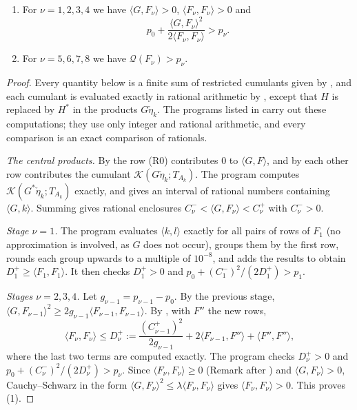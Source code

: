 \documentclass[11pt,colorlinks]{charlie}
\newcommand{\Ka}{\mathcal{K}}
\begin{document}
\begin{proposition}\label{prop:certificate}
\begin{enumerate}
\item For $\nu=1,2,3,4$ we have $\langle G,F_\nu\rangle>0$, $\langle F_\nu,F_\nu\rangle>0$ and
\[
 p_0+\frac{\langle G,F_\nu\rangle^2}{2\langle F_\nu,F_\nu\rangle}>p_\nu .
\]
\item For $\nu=5,6,7,8$ we have $\mathcal Q(F_\nu)>p_\nu$.
\end{enumerate}
\end{proposition}

\begin{proof}
Every quantity below is a finite sum of restricted cumulants given by , and each cumulant is evaluated exactly in rational arithmetic by , except that $H$ is replaced by $H^*$ in the products $G\check\eta_k$. The programs listed in  carry out these computations; they use only integer and rational arithmetic, and every comparison is an exact comparison of rationals.

\emph{The central products.} By  the row (R0) contributes $0$ to $\langle G,F\rangle$, and by  each other row contributes the cumulant $\Ka(G\check\eta_k;T_{A_k})$. The program computes $\Ka(G^*\check\eta_k;T_{A_k})$ exactly, and  gives an interval of rational numbers containing $\langle G,k\rangle$. Summing gives rational enclosures $C_\nu^-<\langle G,F_\nu\rangle<C_\nu^+$ with $C_\nu^->0$.

\emph{Stage $\nu=1$.} The program evaluates $\langle k,l\rangle$ exactly for all pairs of rows of $F_1$ (no approximation is involved, as $G$ does not occur), groups them by the first row, rounds each group upwards to a multiple of $10^{-8}$, and adds the results to obtain $D_1^+\ge\langle F_1,F_1\rangle$. It then checks $D_1^+>0$ and $p_0+(C_1^-)^2/(2D_1^+)>p_1$.

\emph{Stages $\nu=2,3,4$.} Let $g_{\nu-1}=p_{\nu-1}-p_0$. By the previous stage, $\langle G,F_{\nu-1}\rangle^2\ge2g_{\nu-1}\langle F_{\nu-1},F_{\nu-1}\rangle$. By , with $F''$ the new rows,
\[
 \langle F_\nu,F_\nu\rangle\le D_\nu^+:=\frac{(C_{\nu-1}^+)^2}{2g_{\nu-1}}+2\langle F_{\nu-1},F''\rangle+\langle F'',F''\rangle,
\]
where the last two terms are computed exactly. The program checks $D_\nu^+>0$ and $p_0+(C_\nu^-)^2/(2D_\nu^+)>p_\nu$. Since $\langle F_\nu,F_\nu\rangle\ge0$ (Remark after ) and $\langle G,F_\nu\rangle>0$, Cauchy--Schwarz in the form $\langle G,F_\nu\rangle^2\le\lambda\langle F_\nu,F_\nu\rangle$ gives $\langle F_\nu,F_\nu\rangle>0$. This proves (1).


\end{proof}
\end{document}
